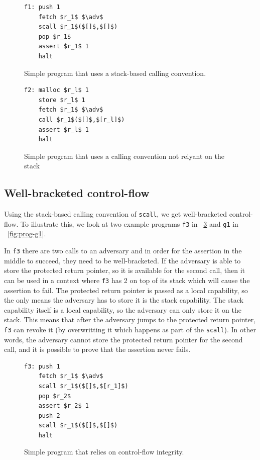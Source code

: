 \documentclass[compsoc,conference,letterpaper,fleqn]{IEEEtran}
\newcommand{\var}[1]{\mathit{#1}}
\newcommand{\adv}{\var{adv}}
\begin{document}
\begin{figure}[htbp]
  \centering
  \begin{lstlisting}
f1: push 1
    fetch $r_1$ $\adv$
    scall $r_1$($[]$,$[]$)
    pop $r_1$
    assert $r_1$ 1
    halt
\end{lstlisting}
  \caption{Simple program that uses a stack-based calling convention.}
  \label{fig:prog-f1}
\end{figure}

\begin{figure}[htbp]
  \centering
\begin{lstlisting}
f2: malloc $r_l$ 1
    store $r_l$ 1
    fetch $r_1$ $\adv$
    call $r_1$($[]$,$[r_l]$)
    assert $r_l$ 1
    halt
\end{lstlisting}
  \caption{Simple program that uses a calling convention not relyant
    on the stack}
  \label{fig:prog-f2}
\end{figure}

\subsection{Well-bracketed control-flow} 
Using the stack-based calling convention of \texttt{scall}, we get
well-bracketed control-flow. To illustrate this, we look at
two example programs \texttt{f3} in \figurename~\ref{fig:prog-f3} and
\texttt{g1} in \figurename~\ref{fig:prog-g1}.

In \texttt{f3} there are two calls to an adversary and in order for
the assertion in the middle to succeed, they need to be
well-bracketed. If the adversary is able to store the protected return
pointer, so it is available for the second call, then it can be used
in a context where \texttt{f3} has 2 on top of its stack which will cause the
assertion to fail. The protected return pointer is passed as a local
capability, so the only means the adversary has to store it is the
stack capability. The stack capability itself is a local capability,
so the adversary can only store it on the stack. This means that after
the adversary jumps to the protected return pointer, \texttt{f3} can
revoke it (by overwritting it which happens as part of the
\texttt{scall}). In other words, the adversary cannot store the
protected return pointer for the second call, and it is possible to
prove that the assertion never fails.
\begin{figure}[htbp]
  \centering
  \begin{lstlisting}
f3: push 1
    fetch $r_1$ $\adv$
    scall $r_1$($[]$,$[r_1]$)
    pop $r_2$
    assert $r_2$ 1
    push 2
    scall $r_1$($[]$,$[]$)
    halt
\end{lstlisting}
  \caption{Simple program that relies on control-flow integrity.}
  \label{fig:prog-f3}
\end{figure}
\end{document}
